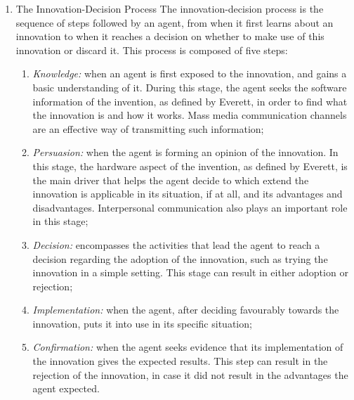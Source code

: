 \documentclass[12pt]{article}
\begin{document}
\begin{enumerate}
\item The Innovation-Decision Process
\label{sec:org3ca9536}
The innovation-decision process is the sequence of steps followed by an agent, from when it first learns about an innovation to when it reaches a decision on whether to make use of this innovation or discard it. This process is composed of five steps:

\begin{enumerate}
\item \emph{Knowledge:} when an agent is first exposed to the innovation, and gains a basic understanding of it. During this stage, the agent seeks the software information of the invention, as defined by Everett, in order to find what the innovation is and how it works. Mass media communication channels are an effective way of transmitting such information;
\item \emph{Persuasion:} when the agent is forming an opinion of the innovation. In this stage, the hardware aspect of the invention, as defined by Everett, is the main driver that helps the agent decide to which extend the innovation is applicable in its situation, if at all, and its advantages and disadvantages. Interpersonal communication also plays an important role in this stage;
\item \emph{Decision:} encompasses the activities that lead the agent to reach a decision regarding the adoption of the innovation, such as trying the innovation in a simple setting. This stage can result in either adoption or rejection;
\item \emph{Implementation:} when the agent, after deciding favourably towards the innovation, puts it into use in its specific situation;
\item \emph{Confirmation:} when the agent seeks evidence that its implementation of the innovation gives the expected results. This step can result in the rejection of the innovation, in case it did not result in the advantages the agent expected.
\end{enumerate}
\end{enumerate}
\end{document}
